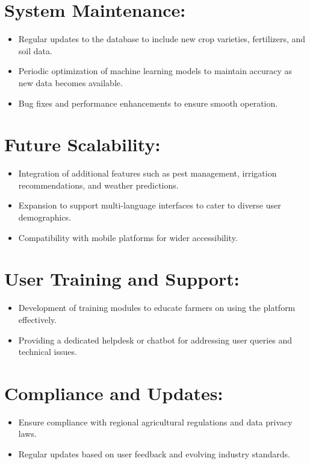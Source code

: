 \documentclass{scrreprt}
\begin{document}
\section{System Maintenance:} 
    \begin{itemize}
        \item Regular updates to the database to include new crop varieties, fertilizers, and soil data.
        \item Periodic optimization of machine learning models to maintain accuracy as new data becomes available.
        \item Bug fixes and performance enhancements to ensure smooth operation.
    \end{itemize}
\section{Future Scalability:} 
    \begin{itemize}
        \item Integration of additional features such as pest management, irrigation recommendations, and weather predictions.
        \item Expansion to support multi-language interfaces to cater to diverse user demographics.
        \item Compatibility with mobile platforms for wider accessibility.
    \end{itemize}
\section{User Training and Support:}
    \begin{itemize}
        \item Development of training modules to educate farmers on using the platform effectively.
        \item Providing a dedicated helpdesk or chatbot for addressing user queries and technical issues.
    \end{itemize}
\section{Compliance and Updates:} 
    \begin{itemize}
        \item Ensure compliance with regional agricultural regulations and data privacy laws.
        \item Regular updates based on user feedback and evolving industry standards.
    \end{itemize}
\end{document}
